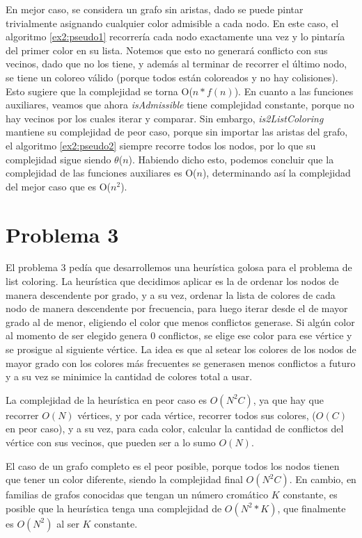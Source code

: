 \documentclass{article}
\theoremstyle{definition}
\theoremstyle{remark}
\begin{document}
En mejor caso, se considera un grafo sin aristas, dado se puede pintar trivialmente asignando cualquier color admisible a cada nodo. En este caso, el algoritmo \ref{ex2:pseudo1} recorrería cada nodo exactamente una vez y lo pintaría del primer color en su lista. Notemos que esto no generará conflicto con sus vecinos, dado que no los tiene, y además al terminar de recorrer el último nodo, se tiene un coloreo válido (porque todos están coloreados y no hay colisiones). Esto sugiere que la complejidad se torna O($n*f(n)$).
En cuanto a las funciones auxiliares, veamos que ahora \textit{isAdmissible} tiene complejidad constante, porque no hay vecinos por los cuales iterar y comparar. Sin embargo, \textit{is2ListColoring} mantiene su complejidad de peor caso, porque sin importar las aristas del grafo, el algoritmo \ref{ex2:pseudo2} siempre recorre todos los nodos, por lo que su complejidad sigue siendo $\theta$($n$). Habiendo dicho esto, podemos concluir que la complejidad de las funciones auxiliares es O($n$), determinando así la complejidad del mejor caso que es O($n^{2}$).

\section{Problema 3}

El problema 3 pedía que desarrollemos una heurística golosa para el problema
de list coloring. La heurística que decidimos aplicar es la de ordenar los nodos de manera descendente por grado, y a su vez, ordenar la lista de colores de cada nodo de manera descendente por frecuencia, para luego iterar desde el de mayor grado al de menor, eligiendo el color que menos conflictos generase. Si algún color al momento de ser elegido genera 0 conflictos, se elige ese color para ese vértice y se prosigue al siguiente vértice. 
La idea es que al setear los colores de los nodos de mayor grado con los colores más frecuentes se generasen menos conflictos a futuro y a su vez se minimice la cantidad de colores total a usar.

La complejidad de la heurística en peor caso es $O(N^{2}C)$, ya que hay que recorrer $O(N)$ vértices, y por cada vértice, recorrer todos sus colores, ($O(C)$ en peor caso), y a su vez, para cada color, calcular la cantidad de conflictos del vértice con sus vecinos, que pueden ser a lo sumo $O(N)$.

El caso de un grafo completo es el peor posible, porque todos los nodos tienen que tener un color diferente, siendo la complejidad final $O(N^{2}C)$.
En cambio, en familias de grafos conocidas que tengan un número cromático $K$ constante, es posible que la heurística tenga una complejidad de $O(N^2 * K)$, que finalmente es $O(N^2)$ al ser $K$ constante.
\end{document}
